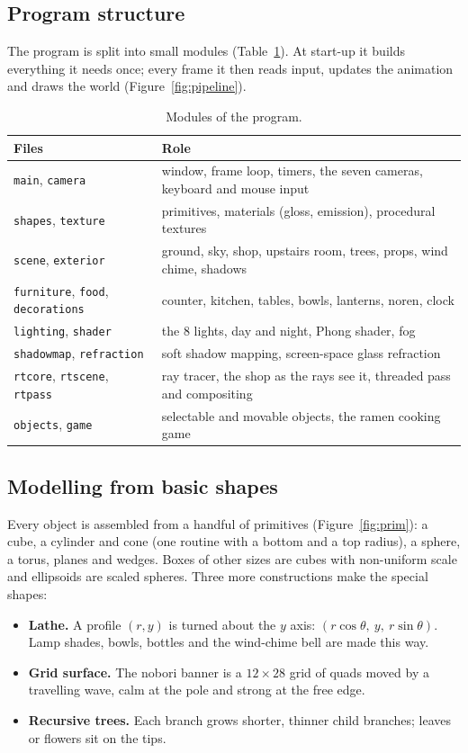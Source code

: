 \documentclass[10pt,a4paper]{article}
\newcommand{\code}[1]{\texttt{\small #1}}
\begin{document}
\subsection{Program structure}
The program is split into small modules (Table~\ref{tab:modules}). At start-up it builds everything it needs once; every frame it then reads input, updates the animation and draws the world (Figure~\ref{fig:pipeline}).
\begin{table}[htbp]
\centering\small
\begin{tabular}{@{}p{4.6cm}p{11.3cm}@{}}
\toprule
\textbf{Files} & \textbf{Role}\\
\midrule
\code{main}, \code{camera} & window, frame loop, timers, the seven cameras, keyboard and mouse input\\
\code{shapes}, \code{texture} & primitives, materials (gloss, emission), procedural textures\\
\code{scene}, \code{exterior} & ground, sky, shop, upstairs room, trees, props, wind chime, shadows\\
\code{furniture}, \code{food}, \code{decorations} & counter, kitchen, tables, bowls, lanterns, noren, clock\\
\code{lighting}, \code{shader} & the 8 lights, day and night, Phong shader, fog\\
\code{shadowmap}, \code{refraction} & soft shadow mapping, screen-space glass refraction\\
\code{rtcore}, \code{rtscene}, \code{rtpass} & ray tracer, the shop as the rays see it, threaded pass and compositing\\
\code{objects}, \code{game} & selectable and movable objects, the ramen cooking game\\
\bottomrule
\end{tabular}
\caption{Modules of the program.}\label{tab:modules}
\end{table}


\subsection{Modelling from basic shapes}\label{sec:model}
Every object is assembled from a handful of primitives (Figure~\ref{fig:prim}): a cube, a cylinder and cone (one routine with a bottom and a top radius), a sphere, a torus, planes and wedges. Boxes of other sizes are cubes with non-uniform scale and ellipsoids are scaled spheres. Three more constructions make the special shapes:
\begin{itemize}
\item \textbf{Lathe.} A profile $(r,y)$ is turned about the $y$ axis: $(r\cos\theta,\ y,\ r\sin\theta)$. Lamp shades, bowls, bottles and the wind-chime bell are made this way.
\item \textbf{Grid surface.} The nobori banner is a $12\times28$ grid of quads moved by a travelling wave, calm at the pole and strong at the free edge.
\item \textbf{Recursive trees.} Each branch grows shorter, thinner child branches; leaves or flowers sit on the tips.
\end{itemize}

\end{document}

